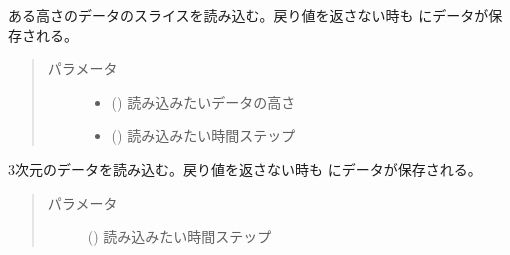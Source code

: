 \documentclass[letterpaper,10pt,dvipdfmx,report]{sphinxmanual}
\begin{document}
\begin{fulllineitems}
\label{\detokenize{io:R2D2.R2D2_data.read_qq_select}}
ある高さのデータのスライスを読み込む。戻り値を返さない時も {\hyperref[\detokenize{io:R2D2.R2D2_data.qs}]{}} にデータが保存される。
\begin{quote}\begin{description}
\item[{パラメータ}] \leavevmode\begin{itemize}
\item {} 
 () \sphinxhyphen{}\sphinxhyphen{} 読み込みたいデータの高さ

\item {} 
 () \sphinxhyphen{}\sphinxhyphen{} 読み込みたい時間ステップ

\end{itemize}

\end{description}\end{quote}

\end{fulllineitems}


\begin{fulllineitems}
\label{\detokenize{io:R2D2.R2D2_data.read_qq}}
3次元のデータを読み込む。戻り値を返さない時も {\hyperref[\detokenize{io:R2D2.R2D2_data.qq}]{}} にデータが保存される。
\begin{quote}\begin{description}
\item[{パラメータ}] \leavevmode
{} () \sphinxhyphen{}\sphinxhyphen{} 読み込みたい時間ステップ

\end{description}\end{quote}

\end{fulllineitems}
\end{document}
